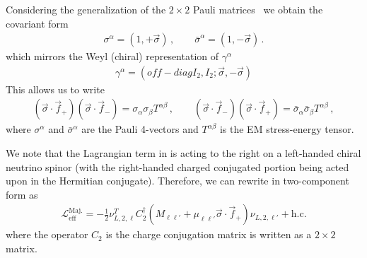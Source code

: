 Considering the generalization of the $2\times 2$ Pauli matrices~\cite{Ohlsson:2011zz} we obtain the covariant form 
\begin{align}       \label{cross:1a}    
        \sigma^{\alpha}=(1,+\vec{\sigma})\,,\qquad
        \bar\sigma^{\alpha}=(1,-\vec{\sigma})\,.
\end{align}
which mirrors the Weyl (chiral) representation of $\gamma^\alpha$
\begin{align}       \label{cross:1c}    
\gamma^\alpha =(off-diag I_2,I_2;\vec\sigma,-\vec\sigma)
\end{align}
This allows us to write 
        \begin{align}
        \label{cross:2}        \left(\vec{\sigma}\cdot\vec{f}_{+}\right)\left(\vec{\sigma}\cdot\vec{f}_{-}\right)=\sigma_{\alpha}\sigma_{\beta}T^{\alpha\beta}\,,\qquad
        \left(\vec{\sigma}\cdot\vec{f}_{-}\right)\left(\vec{\sigma}\cdot\vec{f}_{+}\right)=\bar\sigma_{\alpha}\bar\sigma_{\beta}T^{\alpha\beta}\,,
\end{align}
where $\sigma^{\alpha}$ and $\bar\sigma^{\alpha}$ are the Pauli 4-vectors and $T^{\alpha\beta}$ is the EM stress-energy tensor.




We note that the Lagrangian term in  is acting to the right on a left-handed chiral neutrino spinor (with the right-handed charged conjugated portion being acted upon in the Hermitian conjugate). Therefore, we can rewrite  in two-component form as
\begin{align}
    \label{massmom:1a}
    \mathcal{L}_\mathrm{eff}^\mathrm{Maj.} = 
    -\frac{1}{2}\nu_{L,2,\ell}^{T}C_{2}^{\dag}\left(M_{\ell\ell'}+\mu_{\ell\ell'}\vec{\sigma}\cdot\vec{f}_{+}\right)\nu_{L,2,\ell'}+\mathrm{h.c.}
\end{align}
where the operator $C_{2}$ is the charge conjugation matrix is written as a $2\times 2$ matrix.
